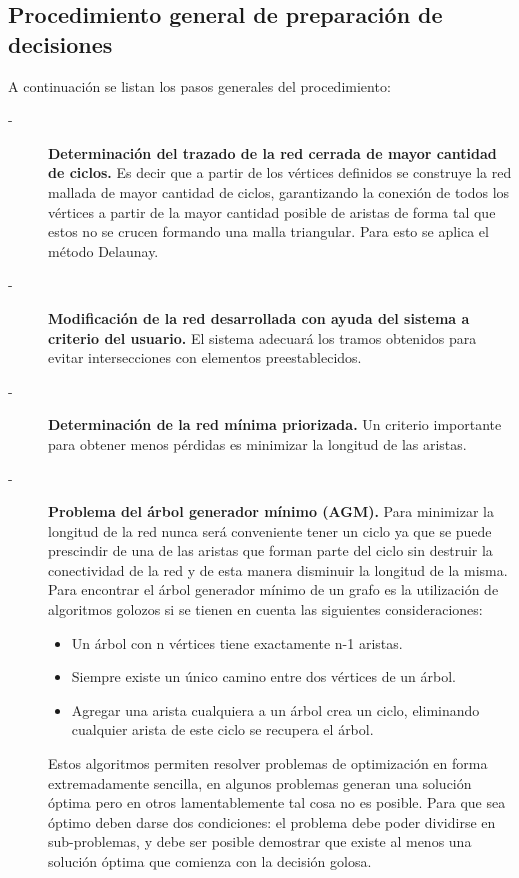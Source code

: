 \subsection*{Procedimiento general de preparación de decisiones}
\noindent A continuación se listan los pasos generales del procedimiento:
\begin{description}
    \item[-]\textbf{Determinación del trazado de la red cerrada de mayor cantidad de ciclos.} Es decir que a partir de los vértices definidos se construye la red mallada de mayor cantidad de ciclos, garantizando la conexión de todos los vértices a partir de la mayor cantidad posible de aristas de forma tal que estos no se crucen formando una malla triangular. Para esto se aplica el método Delaunay.
    \item[-]\textbf{Modificación de la red desarrollada con ayuda del sistema a criterio del usuario.} El sistema adecuará los tramos obtenidos para evitar intersecciones con elementos preestablecidos.
    \item[-]\textbf{Determinación de la red mínima priorizada.} Un criterio importante para obtener menos pérdidas es minimizar la longitud de las aristas.
    \item[-]\textbf{Problema del árbol generador mínimo (AGM).} Para minimizar la longitud de la red nunca será conveniente tener un ciclo ya que se puede prescindir de una de las aristas que forman parte del ciclo sin destruir la conectividad de la red y de esta manera disminuir la longitud de la misma. Para encontrar el árbol generador mínimo de un grafo es la utilización de algoritmos golozos si se tienen en cuenta las siguientes consideraciones:
    \begin{itemize}
        \item Un árbol con n vértices tiene exactamente n-1 aristas.
        \item Siempre existe un único camino entre dos vértices de un árbol.
        \item Agregar una arista cualquiera a un árbol crea un ciclo, eliminando cualquier arista de este ciclo se recupera el árbol.
    \end{itemize}
    \noindent Estos algoritmos permiten resolver problemas de optimización en forma extremadamente sencilla, en algunos problemas generan una solución óptima pero en otros lamentablemente tal cosa no es posible. Para que sea óptimo deben darse dos condiciones: el problema debe poder dividirse en sub-problemas, y debe ser posible demostrar que existe al menos una solución óptima que comienza con la decisión golosa.

\end{description}
